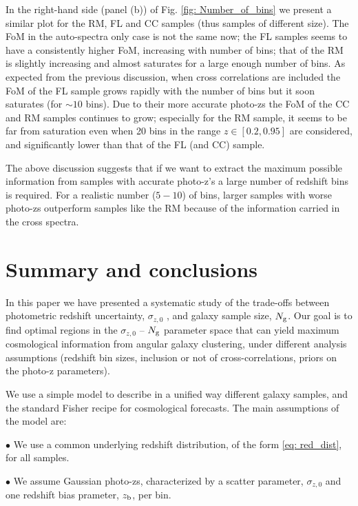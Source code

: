 \documentclass[a4paper,fleqn,usenatbib]{mnras}
\begin{document}
In the right-hand side (panel (b)) of Fig. \ref{fig: Number_of_bins} we present a similar plot for the RM, FL and CC samples (thus samples of different size). The FoM in the auto-spectra only case is not the same now; the FL samples seems to have a consistently higher FoM, increasing with number of bins; that of the RM is slightly increasing and almost saturates for a large enough number of bins.  As expected from the previous discussion, when cross correlations are included the FoM of the FL sample grows rapidly with the number of bins but it soon saturates (for $\sim 10$ bins). Due to their more accurate photo-zs the FoM  of the CC and RM samples continues to grow; especially for the RM sample, it seems to be far from saturation even when 20 bins in the range $z \in [0.2,0.95]$ are considered, and significantly lower than that of the FL (and CC) sample.

The above discussion suggests that if we want to extract the maximum possible information from samples with accurate photo-z's a large number of redshift bins is required. For a realistic number ($5-10$) of bins, larger samples with worse photo-zs outperform samples like the RM because of the information carried in the cross spectra.



\section{Summary and conclusions}

In this paper we have presented a systematic study of the trade-offs between photometric redshift uncertainty, $\sigma_{z,0}$ , and galaxy sample size, $N_{\mbox{\scriptsize{g}}}$. Our goal is to find optimal regions in the $\sigma_{z,0}$ -- $N_{\mbox{\scriptsize{g}}}$ parameter space that can yield maximum cosmological information from angular galaxy clustering, under different analysis assumptions (redshift bin sizes, inclusion or not of cross-correlations, priors on the photo-z parameters).

We use a simple model to describe in a unified way different galaxy samples, and the standard Fisher recipe for cosmological forecasts. The main assumptions of the model are:

$\bullet$ We use a common underlying redshift distribution, of the form \eqref{eq: red_dist}, for all samples.

$\bullet$ We assume Gaussian photo-zs, characterized by a scatter parameter, $\sigma_{z,0}$ and one redshift bias prameter, $z_{\mbox{\scriptsize{b}}}$, per bin.
\end{document}
